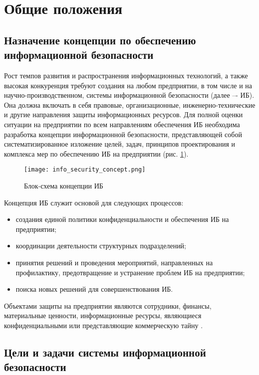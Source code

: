 
\section{Общие положения}
\label{sec:general}

\subsection{Назначение концепции по обеспечению информационной безопасности}
\label{subsec:general:purpose}

Рост темпов развития и распространения информационных технологий, а также высокая конкуренция требуют создания на любом предприятии, в том числе и на научно-производственном, системы информационной безопасности (далее –- ИБ).
Она должна включать в себя правовые, организационные, инженерно-технические и другие направления защиты информационных ресурсов.
Для полной оценки ситуации на предприятии по всем направлениям обеспечения ИБ необходима разработка концепции информационной безопасности, представляющей собой систематизированное изложение целей, задач, принципов проектирования и комплекса мер по обеспечению ИБ на предприятии (рис. \ref{fig:info_security_concept}).

\begin{figure}[ht]
    \centering
    \texttt{[image: info\_security\_concept.png]}  
	\caption{Блок-схема концепции ИБ}
	\label{fig:info_security_concept}
\end{figure}

Концепция ИБ служит основой для следующих процессов:
\begin{itemize}
	\item создания единой политики конфиденциальности и обеспечения ИБ на предприятии;
	\item координации деятельности структурных подразделений;
	\item принятия решений и проведения мероприятий, направленных на профилактику, предотвращение и устранение проблем ИБ на предприятии;
	\item поиска новых решений для совершенствования ИБ.
\end{itemize}

Объектами защиты на предприятии являются сотрудники, финансы, материальные ценности, информационные ресурсы, являющиеся конфиденциальными или представляющие коммерческую тайну \cite{info_security_concept_2020}.

\subsection{Цели и задачи системы информационной безопасности}
\label{subsec:general:goals}

